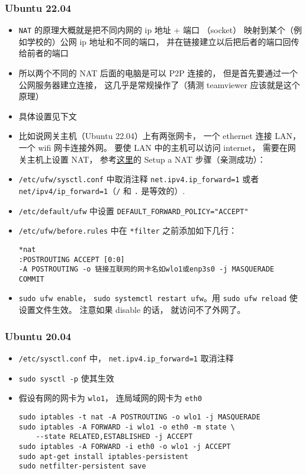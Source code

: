 \subsubsection{Ubuntu 22.04}
\begin{itemize}
\item \verb`NAT` 的原理大概就是把不同内网的 ip 地址 + 端口 （socket） 映射到某个（例如学校的）公网 ip 地址和不同的端口， 并在链接建立以后把后者的端口回传给前者的端口
\item 所以两个不同的 NAT 后面的电脑是可以 P2P 连接的， 但是首先要通过一个公网服务器建立连接， 这几乎是常规操作了（猜测 teamviewer 应该就是这个原理）
\item 具体设置见下文
\item 比如说网关主机（Ubuntu 22.04）上有两张网卡， 一个 ethernet 连接 LAN， 一个 wifi 网卡连接外网。 要使 LAN 中的主机可以访问 internet， 需要在网关主机上设置 NAT， 参考\href{https://unix.stackexchange.com/questions/575178/sharing-wifi-internet-through-ethernet-interface}{这里}的 Setup a NAT 步骤（亲测成功）：
\item \verb`/etc/ufw/sysctl.conf` 中取消注释 \verb`net.ipv4.ip_forward=1` 或者 \verb`net/ipv4/ip_forward=1`（\verb`/` 和 \verb`.` 是等效的）.
\item \verb`/etc/default/ufw` 中设置 \verb`DEFAULT_FORWARD_POLICY="ACCEPT"`
\item \verb`/etc/ufw/before.rules` 中在 \verb`*filter` 之前添加如下几行：
\begin{lstlisting}[language=none]
*nat
:POSTROUTING ACCEPT [0:0]
-A POSTROUTING -o 链接互联网的网卡名如wlo1或enp3s0 -j MASQUERADE
COMMIT
\end{lstlisting}
\item \verb`sudo ufw enable`， \verb`sudo systemctl restart ufw`。用 \verb`sudo ufw reload` 使设置文件生效。 注意如果 disable 的话， 就访问不了外网了。
\end{itemize}

\subsubsection{Ubuntu 20.04}
\begin{itemize}
\item \verb`/etc/sysctl.conf` 中， \verb`net.ipv4.ip_forward=1` 取消注释
\item \verb`sudo sysctl -p` 使其生效
\item 假设有网的网卡为 \verb`wlo1`， 连局域网的网卡为 \verb`eth0`
\begin{lstlisting}[language=none]
sudo iptables -t nat -A POSTROUTING -o wlo1 -j MASQUERADE
sudo iptables -A FORWARD -i wlo1 -o eth0 -m state \
    --state RELATED,ESTABLISHED -j ACCEPT
sudo iptables -A FORWARD -i eth0 -o wlo1 -j ACCEPT
sudo apt-get install iptables-persistent
sudo netfilter-persistent save
\end{lstlisting}
\end{itemize}

